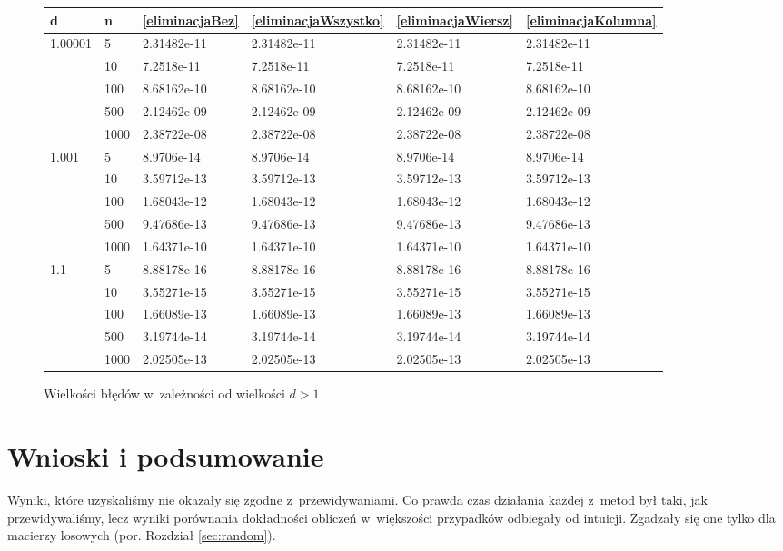 \documentclass[a4paper]{article}
\begin{document}
\begin{figure}[H]
\centering
\begin{tabular}{l||l|l|l|l|l}
 d	&	n	&	\ref{eliminacjaBez}	&	\ref{eliminacjaWszystko}	&	\ref{eliminacjaWiersz}	&	\ref{eliminacjaKolumna}	\\ \hline \hline
\multirow{5}{*}{1.00001}	&	5	&		2.31482e-11	&		2.31482e-11	&		2.31482e-11	&		2.31482e-11\\ \cline{2-6}  
	&	10	&		7.2518e-11	&		7.2518e-11	&		7.2518e-11	&		7.2518e-11\\ \cline{2-6}  
	&	100	&		8.68162e-10	&		8.68162e-10	&		8.68162e-10	&		8.68162e-10\\ \cline{2-6}  
	&	500	&		2.12462e-09	&		2.12462e-09	&		2.12462e-09	&		2.12462e-09\\ \cline{2-6}  
	&	1000	&		2.38722e-08	&		2.38722e-08	&		2.38722e-08	&		2.38722e-08\\ \hline \hline  

\multirow{5}{*}{1.001}	&	5	&		8.9706e-14	&		8.9706e-14	&		8.9706e-14	&		8.9706e-14\\ \cline{2-6}  
	&	10	&		3.59712e-13	&		3.59712e-13	&		3.59712e-13	&		3.59712e-13\\ \cline{2-6}  
	&	100	&		1.68043e-12	&		1.68043e-12	&		1.68043e-12	&		1.68043e-12\\ \cline{2-6}  
	&	500	&		9.47686e-13	&		9.47686e-13	&		9.47686e-13	&		9.47686e-13\\ \cline{2-6}  
	&	1000	&		1.64371e-10	&		1.64371e-10	&		1.64371e-10	&		1.64371e-10\\ \hline \hline  

\multirow{5}{*}{1.1}	&	5	&		8.88178e-16	&		8.88178e-16	&		8.88178e-16	&		8.88178e-16\\ \cline{2-6}  
	&	10	&		3.55271e-15	&		3.55271e-15	&		3.55271e-15	&		3.55271e-15\\ \cline{2-6}  
	&	100	&		1.66089e-13	&		1.66089e-13	&		1.66089e-13	&		1.66089e-13\\ \cline{2-6}  
	&	500	&		3.19744e-14	&		3.19744e-14	&		3.19744e-14	&		3.19744e-14\\ \cline{2-6}  
	&	1000	&		2.02505e-13	&		2.02505e-13	&		2.02505e-13	&		2.02505e-13\\ \hline
\end{tabular}
\caption{Wielkości błędów w~zależności od wielkości $d>1$}
\label{fig:pea tabelka wieksze od 1}
\end{figure}


\section{Wnioski i podsumowanie}
Wyniki, które uzyskaliśmy nie okazały się zgodne z~przewidywaniami. Co prawda czas działania każdej z~metod był taki, jak przewidywaliśmy, lecz wyniki porównania dokładności obliczeń w~większości przypadków
odbiegały od intuicji. Zgadzały się one tylko dla macierzy losowych (por. Rozdział \ref{sec:random}).
\end{document}
